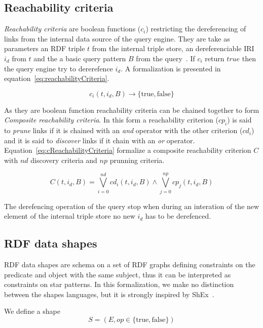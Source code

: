 \subsection{Reachability criteria}

\emph{Reachability criteria} are boolean functions ($c_i$) restricting the dereferencing of links from the internal data source of the query engine.
They are take as parameters an RDF triple $t$ from the internal triple store, an dereferenciable IRI $i_d$ from $t$ and the a basic query pattern $B$ from the query~\cite{Hartig2012}.
If $c_i$ return $true$ then the query engine try to dererefence $i_d$.
A formalization is presented in equation~\ref{eq:reachabilityCriteria}.


\begin{equation}\label{eq:reachabilityCriteria}
c_i(t, i_d, B) \rightarrow \{\mathrm{true}, \mathrm{false}\}
\end{equation}

As they are boolean function reachability criteria can be chained together to form \emph{Composite reachability criteria}.
In this form a reachability criterion ($cp_i$) is said to \emph{prune} links if it is chained with an \emph{and} operator with the other criterion ($cd_i$) and it is said to \emph{discover} links if it chain with an \emph{or} operator.
Equation~\ref{eq:cReachabilityCriteria} formalize a composite reachability criterion $C$ with $nd$ discovery criteria and $np$ prunning criteria.

\begin{equation}\label{eq:cReachabilityCriteria}
    C(t, i_d, B)  = \bigvee_{i=0}^{nd}cd_i(t, i_d, B) \land \bigvee_{j=0}^{np}cp_j(t, i_d, B)
\end{equation}

The derefencing operation of the query stop when during an interation of the new element of the internal triple store no new $i_d$ has to be derefenced.

\subsection{RDF data shapes}
RDF data shapes are schema on a set of RDF graphs defining constraints on the predicate and object with the same subject, thus it can be interpreted as constraints on star patterns.
In this formalization, we make no distinction between the shapes languages, but it is strongly inspired by ShEx~\cite{Gayo2018}.

We define a shape
\begin{equation}
S = (E, op \in \{\mathrm{true},\mathrm{false}\})
\end{equation}

